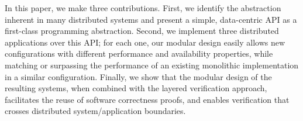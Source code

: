 




In this paper, we make three contributions. First, we identify the \WOR{} abstraction inherent in many distributed systems and present a simple, data-centric \WOR{} API as a first-class programming abstraction. Second, we implement three distributed applications over this API; for each one, our modular design easily allows new configurations with different performance and availability properties, while matching or surpassing the performance of an existing monolithic implementation in a similar configuration. Finally, we show that the modular design of the resulting systems, when combined with the layered verification approach, facilitates the reuse of software correctness proofs, and enables verification that crosses distributed system/application boundaries.

